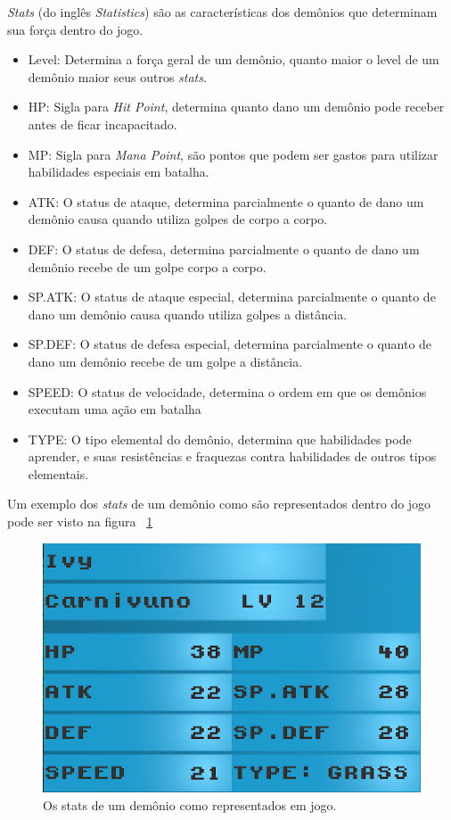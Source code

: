 \documentclass[
	12pt,				%
	openright,			%
	twoside,			%
	a4paper,			%
	english,			%
	french,				%
	spanish,			%
	brazil				%
	]{abntex2}
\begin{document}
\emph{Stats} (do inglês \emph{Statistics}) são as características dos demônios que determinam sua força dentro do jogo.

\begin{itemize}
\item Level: Determina a força geral de um demônio, quanto maior o level de um demônio maior seus outros \emph{stats}.
\item HP: Sigla para \emph{Hit Point}, determina quanto dano um demônio pode receber antes de ficar incapacitado.
\item MP: Sigla para \emph{Mana Point}, são pontos que podem ser gastos para utilizar habilidades especiais em batalha.
\item ATK: O status de ataque, determina parcialmente o quanto de dano um demônio causa quando utiliza golpes de corpo a corpo.
\item DEF: O status de defesa, determina parcialmente o quanto de dano um demônio recebe de um golpe corpo a corpo.
\item SP.ATK: O status de ataque especial, determina parcialmente o quanto de dano um demônio causa quando utiliza golpes a distância.
\item SP.DEF: O status de defesa especial, determina parcialmente o quanto de dano um demônio recebe de um golpe a distância.
\item SPEED:  O status de velocidade, determina o ordem em que os demônios executam uma ação em batalha
\item TYPE: O tipo elemental do demônio, determina que habilidades pode aprender, e suas resistências e fraquezas contra habilidades de outros tipos elementais.
\end{itemize}

Um exemplo dos \emph{stats} de um demônio como são representados dentro do jogo pode ser visto na figura ~\ref{fig:stats}

\begin{figure}[h!]
 \centering
  \includegraphics[width=0.5\linewidth]{statscreen.jpg}
  \caption{Os stats de um demônio como representados em jogo.}
  \label{fig:stats}
\end{figure}
\end{document}
